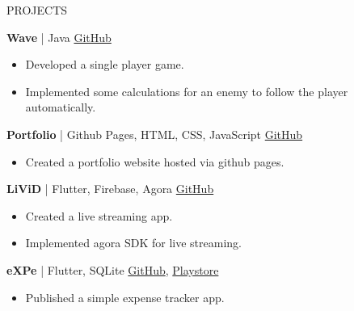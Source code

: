 \documentclass{resume}
\begin{document}
\begin{rSection}{PROJECTS}
\item \textbf{Wave} | {Java} \hfill \href{https://github.com/JayNakum/Wave}{GitHub}
\begin{itemize}
    \itemsep -3pt {} 
    \item Developed a single player game.
    \item Implemented some calculations for an enemy to follow the player automatically.
 \end{itemize}

\item \textbf{Portfolio} | {Github Pages, HTML, CSS, JavaScript} \hfill \href{https://github.com/JayNakum/JayNakum.github.io}{GitHub}
\begin{itemize}
    \itemsep -3pt {} 
    \item Created a portfolio website hosted via github pages.
 \end{itemize}

\item \textbf{LiViD} | {Flutter, Firebase, Agora} \hfill \href{https://github.com/JayNakum/LiViD}{GitHub}
\begin{itemize}
    \itemsep -3pt {} 
     \item Created a live streaming app.
    \item Implemented agora SDK for live streaming.
 \end{itemize}

\item \textbf{eXPe} | {Flutter, SQLite} \hfill \href{https://github.com/JayNakum/eXPe}{GitHub}, \href{https://play.google.com/store/apps/details?id=io.github.jaynakum.expe&pcampaignid=pcampaignidMKT-Other-global-all-co-prtnr-py-PartBadge-Mar2515-1}{Playstore}
\begin{itemize}
    \itemsep -3pt {} 
     \item Published a simple expense tracker app.
 \end{itemize}
\end{rSection} 
\end{document}
